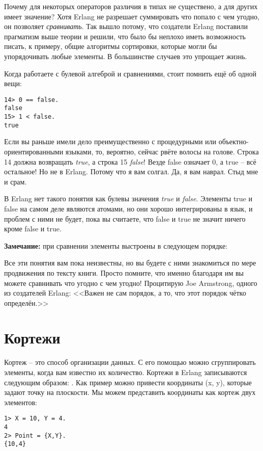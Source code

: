 Почему для некоторых операторов различия в типах не существено, а для других имеет значение?
Хотя Erlang не разрешает суммировать что попало с чем угодно, он позволяет \emph{сравнивать}.
Так вышло потому, что создатели Erlang поставили прагматизм выше теории и решили, что было бы неплохо иметь возможность писать, к примеру, общие алгоритмы сортировки, которые могли бы упорядочивать любые элементы.
В большинстве случаев это упрощает жизнь.

Когда работаете с булевой алгеброй и сравнениями, стоит помнить ещё об одной вещи:
\begin{lstlisting}[style=repl]
14> 0 == false.
false
15> 1 < false.
true
\end{lstlisting}

Если вы раньше имели дело преимущественно с процедурными или объектно\--ориентированными языками, то, вероятно, сейчас рвёте волосы на голове.
Строка 14 должна возвращать \emph{true}, а строка 15 \emph{false}!
Везде false означает 0, а true \--- всё остальное!
Но не в Erlang.
Потому что я вам солгал.
Да, я вам наврал.
Стыд мне и срам.

В Erlang нет такого понятия как булевы значения \emph{true} и \emph{false}.
Элементы true и false на самом деле являются атомами, но они хорошо интегрированы в язык, и проблем с ними не будет, пока вы считаете, что false и true не значит ничего кроме false и true.\\ 
\colorbox{lgray}
{
    \begin{minipage}{1.0\linewidth}
    \textbf{Замечание:} при сравнении элементы выстроены в следующем порядке:\\ 
    
    Все эти понятия вам пока неизвестны, но вы будете с ними знакомиться по мере продвижения по тексту книги.
    Просто помните, что именно благодаря им вы можете сравнивать что угодно с чем угодно!
    Процитирую Joe Armstrong, одного из создателей Erlang: <<Важен не сам порядок, а то, что этот порядок чётко определён.>>
    \end{minipage}
}
\section{Кортежи}
Кортеж \--- это способ организации данных.
С его помощью можно сгруппировать элементы, когда вам известно их количество.
Кортежи в Erlang записываются следующим образом: .
Как пример можно привести координаты (x, y), которые задают точку на плоскости.
Мы можем представить координаты как кортеж двух элементов:
\begin{lstlisting}[style=repl]
1> X = 10, Y = 4.
4
2> Point = {X,Y}.
{10,4}
\end{lstlisting}


